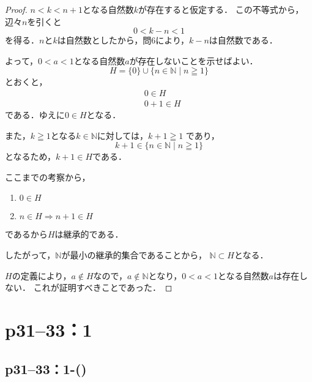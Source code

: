 \begin{tleftbar}
    \begin{proof}
        $n < k < n+1$となる自然数$k$が存在すると仮定する．
        この不等式から，辺々$n$を引くと
        \[
            0 < k - n < 1
        \]
        を得る．$n$と$k$は自然数としたから，問6により，$k-n$は自然数である．

        よって，$0<a<1$となる自然数$a$が存在しないことを示せばよい．
        \[
            H=\{0\} \cup \{n \in \mathbb{N} \mid n \geqq 1 \}
        \]
        とおくと，
        \begin{align*}
             & 0 \in H   \\
             & 0+1 \in H
        \end{align*}
        である．ゆえに$ 0 \in H$となる．

        また，$k \geqq 1$となる$k \in \mathbb{N}$に対しては，$k +1 \geqq 1$
        であり，
        \[
            k+1 \in \{n \in \mathbb{N} \mid n \geqq 1 \}
        \]
        となるため，$k+1 \in H$である．

        ここまでの考察から，
        \begin{enumerate}
            \item $0 \in H$
            \item $n \in H \Longrightarrow n+1 \in H$
        \end{enumerate}
        であるから$H$は継承的である．

        したがって，$\mathbb{N}$が最小の継承的集合であることから，
        $\mathbb{N} \subset H$となる．

        $H$の定義により，$a \notin H$なので，$a \notin \mathbb{N}$となり，$0<a<1$となる自然数$a$は存在しない．
        これが証明すべきことであった．
    \end{proof}
\end{tleftbar}

\newpage

\section*{p31--33：1}


\subsection*{p31--33：1-()}

